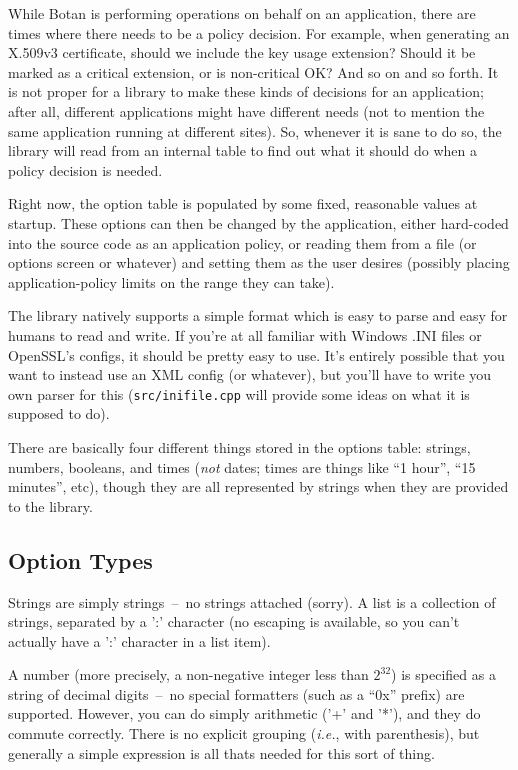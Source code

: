 \documentclass{article}
\newcommand{\filename}[1]{\texttt{#1}}
\newcommand{\ie}[0]{\emph{i.e.}}
\begin{document}
While Botan is performing operations on behalf on an application, there are
times where there needs to be a policy decision. For example, when generating
an X.509v3 certificate, should we include the key usage extension? Should it be
marked as a critical extension, or is non-critical OK? And so on and so
forth. It is not proper for a library to make these kinds of decisions for an
application; after all, different applications might have different needs (not
to mention the same application running at different sites). So, whenever it is
sane to do so, the library will read from an internal table to find out what it
should do when a policy decision is needed.

Right now, the option table is populated by some fixed, reasonable values at
startup. These options can then be changed by the application, either
hard-coded into the source code as an application policy, or reading them from
a file (or options screen or whatever) and setting them as the user desires
(possibly placing application-policy limits on the range they can take).

The library natively supports a simple format which is easy to parse and easy
for humans to read and write. If you're at all familiar with Windows .INI files
or OpenSSL's configs, it should be pretty easy to use. It's entirely possible
that you want to instead use an XML config (or whatever), but you'll have to
write you own parser for this (\filename{src/inifile.cpp} will provide some
ideas on what it is supposed to do).

There are basically four different things stored in the options table: strings,
numbers, booleans, and times (\emph{not} dates; times are things like ``1
hour'', ``15 minutes'', etc), though they are all represented by strings when
they are provided to the library.

\subsection{Option Types}

Strings are simply strings~--~no strings attached (sorry). A list is a
collection of strings, separated by a ':' character (no escaping is available,
so you can't actually have a ':' character in a list item).

A number (more precisely, a non-negative integer less than $2^{32}$) is
specified as a string of decimal digits~--~no special formatters (such as a
``0x'' prefix) are supported. However, you can do simply arithmetic ('+' and
'*'), and they do commute correctly. There is no explicit grouping (\ie, with
parenthesis), but generally a simple expression is all thats needed for this
sort of thing.
\end{document}
